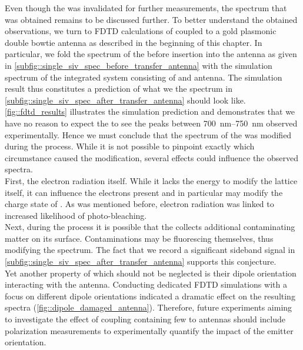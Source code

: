 				Even though the \nd was invalidated for further measurements, the spectrum that was obtained remains to be discussed further. To better understand the obtained observations, we turn to FDTD calculations of \nd coupled to a gold plasmonic double bowtie antenna as described in the beginning of this chapter. In particular, we fold the spectrum of the \nd before insertion into the antenna as given in \cref{subfig::single_siv_spec_before_transfer_antenna} with the simulation spectrum of the integrated system consisting of \nd and antenna. The simulation result thus constitutes a prediction of what we the spectrum in \cref{subfig::single_siv_spec_after_transfer_antenna} should look like. \cref{fig::fdtd_results} illustrates the simulation prediction and demonstrates that we have no reason to expect the to see the peaks between \SIrange{700}{750}{nm} observed experimentally. Hence we must conclude that the spectrum of the \nd was modified during the \pp process. While it is not possible to pinpoint exactly which circumstance caused the modification, several effects could influence the observed spectra.
				\\
				First, the electron radiation itself. While it lacks the energy to modify the lattice itself, it can influence the electrons present and in particular may modify the charge state of \sivs. As was mentioned before, electron radiation was linked to increased likelihood of photo-bleaching.
				\\
				Next, during the \pp process it is possible that the \nd collects additional contaminating matter on its surface. Contaminations may be fluorescing themselves, thus modifying the spectrum. The fact that we record a significant sideband signal in \cref{subfig::single_siv_spec_after_transfer_antenna} supports this conjecture.
				\\
				Yet another property of \sivs which should not be neglected is their dipole orientation interacting with the antenna. Conducting dedicated FDTD simulations with a focus on different dipole orientations indicated a dramatic effect on the resulting spectra (\cref{fig::dipole_damaged_antenna}). Therefore, future experiments aiming to investigate the effect of coupling \nds containing few \sivs to antennas should include polarization measurements to experimentally quantify the impact of the emitter orientation.
				\\

